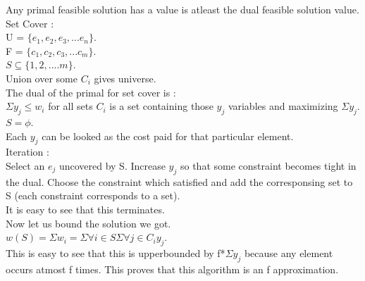 \documentclass[solution,addpoints,12pt]{exam}
\begin{document}
Any primal feasible solution has a value is atleast the
dual feasible solution value.\\
Set Cover :\\
U = $\{e_1, e_2, e_3, ... e_n\}$.\\
F = $\{c_1, c_2, c_3, ... c_m\}$.\\
$S \subseteq \{1, 2, .... m\}$.\\
Union over some $C_i$ gives universe.\\
The dual of the primal for set cover is : \\
$\Sigma y_j \le w_i$ for all sets $C_i$ is a set containing those $y_j$
variables and maximizing $\Sigma y_j$.\\

$S = \phi$.\\
Each $y_j$ can be looked as the cost paid for that particular element.\\

Iteration :\\
Select an $e_j$ uncovered by S. Increase $y_j$ so that some constraint
becomes tight in the dual. Choose the constraint which satisfied
and add the corresponsing set to S (each constraint corresponds to a set).\\

It is easy to see that this terminates.\\
Now let us bound the solution we got.\\
$w(S) = \Sigma w_i = \Sigma \forall i \in S \Sigma \forall j \in C_i y_j$.\\
This is easy to see that this is upperbounded by f*$\Sigma y_j$ because
any element occurs atmost f times. This proves that this algorithm is an f
approximation.\\
\end{document}
